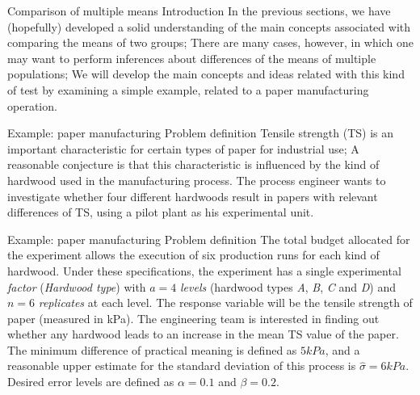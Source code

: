 \documentclass[t]{beamer}
\begin{document}
\begin{ftst}
{Comparison of multiple means}
{Introduction}
In the previous sections, we have (hopefully) developed a solid understanding of the main concepts associated with comparing the means of two groups;
\vone
There are many cases, however, in which one may want to perform inferences about differences of the means of multiple populations;
\vone
We will develop the main concepts and ideas related with this kind of test by examining a simple example, related to a paper manufacturing operation.
\end{ftst}


\begin{ftst}
{Example: paper manufacturing}
{Problem definition}
Tensile strength (TS) is an important characteristic for certain types of paper for industrial use;
\vone
A reasonable conjecture is that this characteristic is influenced by the kind of hardwood used in the manufacturing process.
\vone
The process engineer wants to investigate whether four different hardwoods result in papers with relevant differences of TS, using a pilot plant as his experimental unit.
\end{ftst}


\begin{ftst}
{Example: paper manufacturing}
{Problem definition}
The total budget allocated for the experiment allows the execution of six production runs for each kind of hardwood.
\vone
Under these specifications, the experiment has a single experimental \textit{factor} (\textit{Hardwood type}) with $a = 4$ \textit{levels} (hardwood types \textit{A}, \textit{B}, \textit{C} and \textit{D}) and $n = 6$ \textit{replicates} at each level.
\vone
The response variable will be the tensile strength of paper (measured in kPa). The engineering team is interested in finding out whether any hardwood leads to an increase in the mean TS value of the paper. 
\vone
The minimum difference of practical meaning is defined as $5 kPa$, and a reasonable upper estimate for the standard deviation of this process is $\hat{\sigma} = 6 kPa$. Desired error levels are defined as $\alpha = 0.1$ and $\beta = 0.2$.
\end{ftst}
\end{document}
